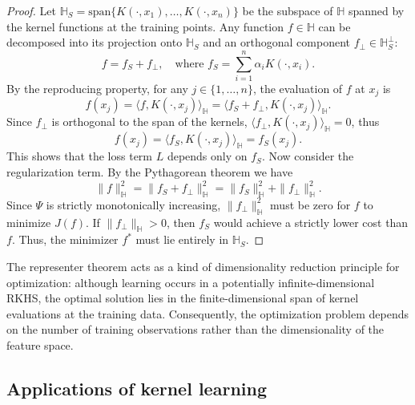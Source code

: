 \begin{proof}
Let $\mathbb{H}_S = \text{span}\{K(\cdot, x_1), \dots, K(\cdot, x_n)\}$ be the subspace of $\mathbb{H}$ spanned by the kernel functions at the training points. Any function $f \in \mathbb{H}$ can be decomposed into its projection onto $\mathbb{H}_S$ and an orthogonal component $f_\perp \in \mathbb{H}_S^\perp$:
$$f = f_S + f_\perp, \quad \text{where } f_S = \sum_{i=1}^n \alpha_i K(\cdot, x_i).$$
By the reproducing property, for any $j \in \{1, \dots, n\}$, the evaluation of $f$ at $x_j$ is
$$f(x_j) = \langle f, K(\cdot, x_j) \rangle_{\mathbb{H}} = \langle f_S + f_\perp, K(\cdot, x_j) \rangle_{\mathbb{H}}.$$
Since $f_\perp$ is orthogonal to the span of the kernels, $\langle f_\perp, K(\cdot, x_j) \rangle_{\mathbb{H}} = 0$, thus
$$f(x_j) = \langle f_S, K(\cdot, x_j) \rangle_{\mathbb{H}} = f_S(x_j).$$
This shows that the loss term $L$ depends only on $f_S$. Now consider the regularization term. By the Pythagorean theorem we have
$$\|f\|_{\mathbb{H}}^2 = \|f_S + f_\perp\|_{\mathbb{H}}^2 = \|f_S\|_{\mathbb{H}}^2 + \|f_\perp\|_{\mathbb{H}}^2.$$
Since $\Psi$ is strictly monotonically increasing, $\|f_\perp\|_{\mathbb{H}}^2$ must be zero for $f$ to minimize $J(f)$. If $\|f_\perp\|_{\mathbb{H}} > 0$, then $f_S$ would achieve a strictly lower cost than $f$. Thus, the minimizer $f^*$ must lie entirely in $\mathbb{H}_S$. 

\end{proof}

The representer theorem acts as a kind of dimensionality reduction principle for optimization: although learning occurs in a potentially infinite-dimensional RKHS, the optimal solution lies in the finite-dimensional span of kernel evaluations at the training data. Consequently, the optimization problem depends on the number of training observations rather than the dimensionality of the feature space.



\subsection{Applications of kernel learning}

